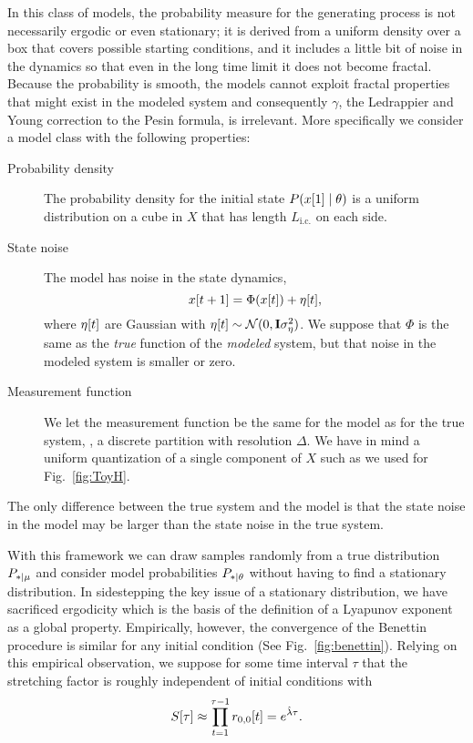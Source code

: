 In this class of models, the probability measure for the generating
process is not necessarily ergodic or even stationary; it is derived
from a uniform density over a box that covers possible starting
conditions, and it includes a little bit of noise in the dynamics so
that even in the long time limit it does not become fractal.  Because
the probability is smooth, the models cannot exploit fractal
properties that might exist in the modeled system and consequently
$\gamma$, the Ledrappier and Young correction to the Pesin formula, is
irrelevant.  More specifically we consider a model class with the
following properties: \newcommand{\Lic}{L_{\text{i.c.}}}
\begin{description}
\item[Probability density] The probability density for the initial
  state $P({x}{[1]}\mid \theta)$ is a uniform distribution on a cube in
  $X$ that has length $\Lic$ on each side.
\item[State noise] The model has noise in the state dynamics,
  \begin{equation}
    \label{eq:PracticalStateMap}
    {x}{[t+1]} = \Phi({x}{[t]}) + {\eta}{[t]},
  \end{equation}
  where ${\eta}{[t]}$ are \iid Gaussian with ${\eta}{[t]} \sim
  {\mathcal{N}}(0,{\bf I} \sigma_\eta^2)$.  We suppose that $\Phi$ is the same as
  the \emph{true} function of the \emph{modeled} system, but that
  noise in the modeled system is smaller or zero.
\item[Measurement function] We let the measurement function be the
  same for the model as for the true system, \ie, a discrete partition
  with resolution $\Delta$.  We have in mind a uniform quantization of
  a single component of $X$ such as we used for Fig.~\ref{fig:ToyH}.
\end{description}
The only difference between the true system and the model is that the
state noise in the model may be larger than the state noise in the
true system.

With this framework we can draw samples randomly from a true
distribution $P_{*\mid \mu}$ and consider model probabilities
$P_{*\mid \theta}$ without having to find a stationary distribution.
In sidestepping the key issue of a stationary distribution, we have
sacrificed ergodicity which is the basis of the definition of a
Lyapunov exponent as a global property.  Empirically, however, the
convergence of the Benettin procedure is similar for any initial
condition (See Fig.~\ref{fig:benettin}).  Relying on this empirical
observation, we suppose for some time interval $\tau$ that the
stretching factor is roughly independent of initial conditions with
\begin{equation}
  \label{eq:Stretch}
  {S}{[\tau]} \approx \prod_{t=1}^{\tau-1} {r_{0,0}}{[t]} = e^{\hat \lambda \tau}.
\end{equation}

